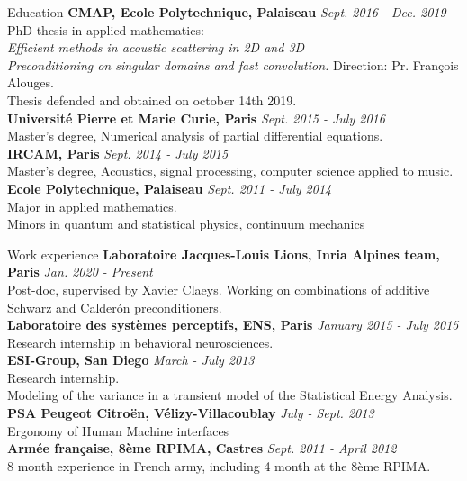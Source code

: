 \documentclass{resume} %
\begin{document}

\begin{rSection}{Education}
{\bf CMAP, Ecole Polytechnique, Palaiseau} \hfill {\em Sept. 2016 - Dec. 2019} 
\\ PhD thesis in applied mathematics:\\
{\em Efficient methods in acoustic scattering in 2D and 3D\\
Preconditioning on singular domains and fast convolution.} \hfill Direction: Pr. François Alouges. \\
Thesis defended and obtained on october 14th 2019.\\ 
{\bf Université Pierre et Marie Curie, Paris} \hfill {\em Sept. 2015 - July 2016} 
\\ Master's degree, Numerical analysis of partial differential equations.\\
{\bf IRCAM, Paris} \hfill {\em Sept. 2014 - July 2015} 
\\ Master's degree, Acoustics, signal processing, computer science applied to music. \\
{\bf Ecole Polytechnique, Palaiseau} \hfill {\em Sept. 2011 - July 2014}\\
Major in applied mathematics. \\
Minors in quantum and statistical physics, continuum mechanics



\end{rSection}

\begin{rSection}{Work experience}
{\bf Laboratoire Jacques-Louis Lions, Inria Alpines team, Paris} \hfill {\em Jan. 2020 - Present} \\
Post-doc, supervised by Xavier Claeys. Working on combinations of additive Schwarz and Calder\'{o}n preconditioners.\\
{\bf Laboratoire des systèmes perceptifs, ENS, Paris} \hfill {\em January 2015 - July 2015} 
\\ Research internship in behavioral neurosciences.\\ 
{\bf ESI-Group, San Diego}
\hfill {\em March - July 2013} \\
Research internship. \\Modeling of the variance in a transient model of the Statistical Energy Analysis. \\
{\bf PSA Peugeot Citroën, Vélizy-Villacoublay} \hfill{\em July - Sept. 2013} \\
Ergonomy of Human Machine interfaces \\
{\bf Armée française, 8ème RPIMA, Castres}  \hfill{\em Sept. 2011 - April 2012}\\
8 month experience in French army, including 4 month at the 8ème RPIMA. 
\end{rSection}
\end{document}

